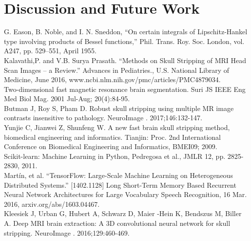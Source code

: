 \documentclass[conference]{IEEEtran}
\begin{document}
\section{Discussion and Future Work}
\begin{thebibliography}{00}
 G. Eason, B. Noble, and I. N. Sneddon, ``On certain integrals of Lipschitz-Hankel type involving products of Bessel functions,'' Phil. Trans. Roy. Soc. London, vol. A247, pp. 529--551, April 1955.\\
 Kalavathi,P. and V.B. Surya Prasath. ``Methods on Skull Stripping of MRI Head Scan Images -- a Review.'' Advances in Pediatries., U.S. National Library of Medicine, June 2016, www.ncbi.nlm.nih.gov/pmc/articles/PMC4879034.\\
 Two-dimensional fast magnetic resonance brain segmentation. Suri JS IEEE Eng Med Biol Mag. 2001 Jul-Aug; 20(4):84-95.\\
 Butman J, Roy S, Pham D. Robust skull stripping using multiple MR image contrasts insensitive to pathology. NeuroImage . 2017;146:132-147.\\
 Yunjie C, Jianwei Z, Shunfeng W. A new fast brain skull stripping method, biomedical engineering and informatics. Tianjin: Proc. 2nd International Conference on Biomedical Engineering and Informatics, BMEI09; 2009.\\
 Scikit-learn: Machine Learning in Python, Pedregosa et al., JMLR 12, pp. 2825-2830, 2011.\\
 Martín, et al. “TensorFlow: Large-Scale Machine Learning on Heterogeneous Distributed Systems.” [1402.1128] Long Short-Term Memory Based Recurrent Neural Network Architectures for Large Vocabulary Speech Recognition, 16 Mar. 2016, arxiv.org/abs/1603.04467.\\
 Kleesiek J, Urban G, Hubert A, Schwarz D, Maier -Hein K, Bendszus M, Biller A. Deep MRI brain extraction: A 3D convolutional neural network for skull stripping. NeuroImage . 2016;129:460-469.

\end{thebibliography}
\end{document}
